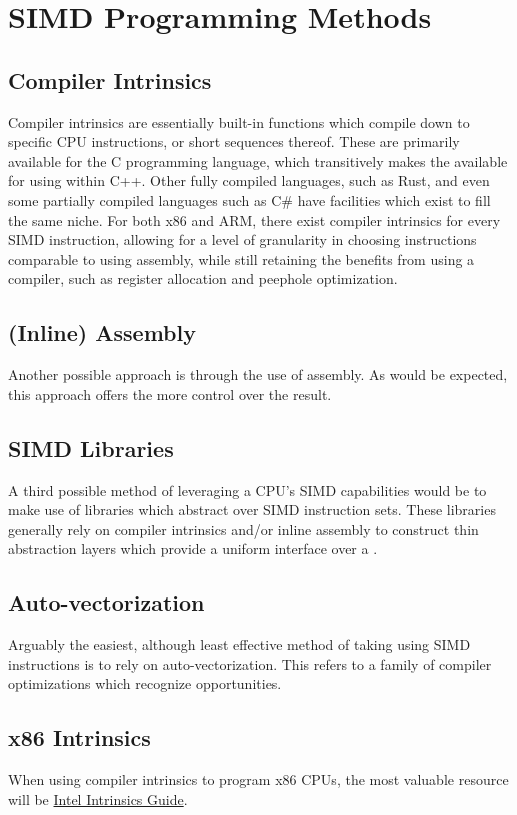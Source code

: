\chapter{SIMD Programming Methods}


\section{Compiler Intrinsics}
Compiler intrinsics are essentially built-in functions which compile down to
specific CPU instructions, or short sequences thereof. These are primarily
available for the C programming language, which transitively makes the available
for using within C++. Other fully compiled languages, such as Rust, and even
some partially compiled languages such as C\# have facilities which exist to
fill the same niche. For both x86 and ARM, there exist compiler intrinsics for
every SIMD instruction, allowing for a level of granularity in choosing
instructions comparable to using assembly, while still retaining the benefits
from using a compiler, such as register allocation and peephole optimization.

\section{(Inline) Assembly}
Another possible approach is through the use of assembly. As would be expected,
this approach offers the more control over the result. 

\section{SIMD Libraries}
A third possible method of leveraging a CPU's SIMD capabilities would be to make
use of libraries which abstract over SIMD instruction sets. These libraries
generally rely on compiler intrinsics and/or inline assembly to construct thin
abstraction layers which provide a uniform interface over a .

\section{Auto-vectorization}
Arguably the easiest, although least effective method of taking using SIMD
instructions is to rely on auto-vectorization. This refers to a family of
compiler optimizations which recognize opportunities.

\section{x86 Intrinsics}
When using compiler intrinsics to program x86 CPUs, the most valuable resource
will be
\href{https://www.intel.com/content/www/us/en/docs/intrinsics-guide/index.html}{Intel
Intrinsics Guide}.

